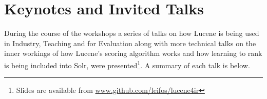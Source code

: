 \section{Keynotes and Invited Talks}
%
During the course of the workshops a series of talks on how Lucene is being used in Industry, Teaching and for Evaluation along with more technical talks on the inner workings of how Lucene's scoring algorithm works and how learning to rank is being included into Solr, were presented\footnote{\scriptsize{Slides are available from \url{www.github.com/leifos/lucene4ir}}}. A summary of each talk is below.

